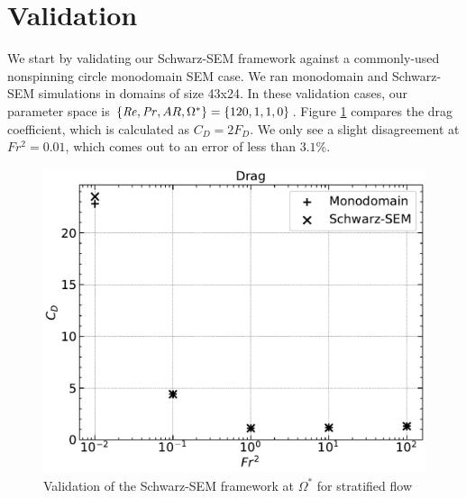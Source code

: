 \section{Validation}
\label{section:validation}
We start by validating our Schwarz-SEM framework against a commonly-used nonspinning circle monodomain SEM case. We ran monodomain and Schwarz-SEM simulations in domains of size 43x24. In these validation cases, our parameter space is $\{\mathit{Re}, \mathit{Pr}, AR, \Omega^{\ast}\} = \{120, 1, 1, 0\}$. Figure \ref{fig:nn val} compares the drag coefficient, which is calculated as $C_D = 2F_D$. We only see a slight disagreement at $Fr^2 = 0.01$, which comes out to an error of less than $3.1\%$.  

\begin{figure}
    \centerline{\includegraphics[width=.8\textwidth]{images/dragvalnn.pdf}}
    \caption{Validation of the Schwarz-SEM framework at $\Omega^{\ast}$ for stratified flow}
    \label{fig:nn val}
\end{figure}

